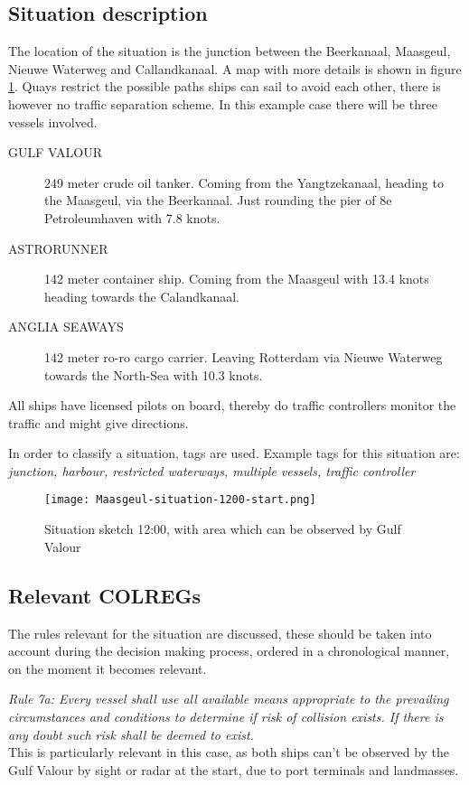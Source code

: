 \subsection{Situation description}
The location of the situation is the junction between the Beerkanaal, Maasgeul, Nieuwe Waterweg and Callandkanaal. A map with more details is shown in figure \ref{fig:Maasgeul-situation-1200}. Quays restrict the possible paths ships can sail to avoid each other, there is however no traffic separation scheme. 
In this example case there will be three vessels involved. 
\begin{description}
	\item [GULF VALOUR] 249 meter crude oil tanker. Coming from the Yangtzekanaal, heading to the Maasgeul, via the Beerkanaal. Just rounding the pier of 8e Petroleumhaven with 7.8 knots.
	\item [ASTRORUNNER] 142 meter container ship. Coming from the Maasgeul with 13.4 knots heading towards the Calandkanaal.
	\item [ANGLIA SEAWAYS] 142 meter ro-ro cargo carrier. Leaving Rotterdam via Nieuwe Waterweg towards the North-Sea with 10.3 knots.
\end{description}

All ships have licensed pilots on board, thereby do traffic controllers monitor the traffic and might give directions.

In order to classify a situation, tags are used. Example tags for this situation are: 
\emph{junction, harbour, restricted waterways, multiple vessels, traffic controller}

\begin{figure}[H]
	\centering
	\texttt{[image: Maasgeul-situation-1200-start.png]}
	\caption{Situation sketch 12:00, with area which can be observed by Gulf Valour}
	\label{fig:Maasgeul-situation-1200}
\end{figure}


\subsection{Relevant COLREGs}
The rules relevant for the situation are discussed, these should be taken into account during the decision making process, ordered in a chronological manner, on the moment it becomes relevant. 

\emph{Rule 7a: Every vessel shall use all available means appropriate to the prevailing circumstances and conditions to determine if risk of collision exists. If there is any doubt such risk shall be deemed to exist.} \\
This is particularly relevant in this case, as both ships can't be observed by the Gulf Valour by sight or radar at the start, due to port terminals and landmasses. 

